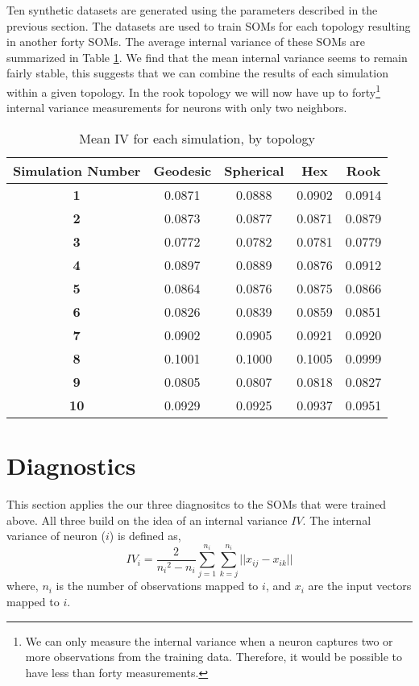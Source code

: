 Ten synthetic datasets are generated using the parameters described in the
previous section. The datasets are used to train SOMs for each topology
resulting in another forty SOMs. The average internal variance of these SOMs
are summarized in Table \ref{ivtable3}.  We find that the mean internal
variance seems to remain fairly stable, this suggests that we can combine the
results of each simulation within a given topology. In the rook topology we
will now have up to forty\footnote{We can only measure the internal variance
when a neuron captures two or more observations from the training data.
Therefore, it would be possible to have less than forty measurements.}
internal variance measurements for neurons with only two neighbors.

\begin{table}[hbt]
\centering
\caption{Mean IV for each simulation, by topology}
\label{ivtable3}
\begin{tabular}{|c||c|c|c|c|}
\hline
\textbf{Simulation Number} & Geodesic & Spherical & Hex & Rook \\
\hline
\hline
\textbf{1} & 0.0871 & 0.0888 & 0.0902 & 0.0914 \\
\hline
\textbf{2} & 0.0873 & 0.0877 & 0.0871 & 0.0879 \\
\hline
\textbf{3} & 0.0772 & 0.0782 & 0.0781 & 0.0779 \\
\hline
\textbf{4} & 0.0897 & 0.0889 & 0.0876 & 0.0912 \\
\hline
\textbf{5} & 0.0864 & 0.0876 & 0.0875 & 0.0866 \\
\hline
\textbf{6} & 0.0826 & 0.0839 & 0.0859 & 0.0851 \\
\hline
\textbf{7} & 0.0902 & 0.0905 & 0.0921 & 0.0920 \\
\hline
\textbf{8} & 0.1001 & 0.1000 & 0.1005 & 0.0999 \\
\hline
\textbf{9} & 0.0805 & 0.0807 & 0.0818 & 0.0827 \\
\hline
\textbf{10} & 0.0929 & 0.0925 & 0.0937 & 0.0951 \\
\hline
\end{tabular} \end{table}

\section{Diagnostics}
This section applies the our three diagnositcs to the SOMs that were trained
above.  All three build on the idea of an internal variance \(IV\). The
internal variance of neuron (\(i\)) is defined as,
 \begin{equation}
   {IV_i} = \frac{2}{{n_i}^2-{n_i}}\sum_{j=1}^{n_i}\sum_{k=j}^{n_i} ||{x_{ij}}-{x_{ik}}||
 \label{eqno1}
 \end{equation}
where, \(n_i\) is the number of observations mapped to \(i\), and \(x_i\) are
the input vectors mapped to \(i\).

